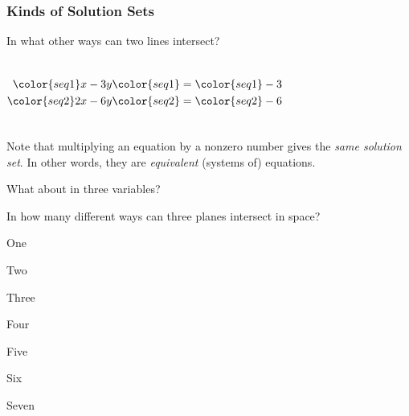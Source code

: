 \begin{frame}
\frametitle{Kinds of Solution Sets}
  
In what other ways can two lines intersect?

\pause\vfill

\begin{columns}[onlytextwidth]
  \[\begin{split}
    \color{seq1}x - 3y &\color{seq1}= \color{seq1}-3 \\
    \color{seq2}2x - 6y &\color{seq2}= \color{seq2}-6
  \end{split}\]
  \pause
  \centering
\end{columns}

\pause
\bigskip
Note that multiplying an equation by a nonzero number gives the
\emph{same solution set}.
\pause In other words, they are \emph{equivalent} (systems
of) equations.

\vfill

\end{frame}



\begin{pollframe}

What about in three variables?
\pause
\bigskip

\begin{bluebox}[Poll]{.65\textwidth}
  In how many different ways can three planes intersect in space?

  \smallskip
  \begin{eAlpherate}
  \item One
  \item Two
  \item Three
  \item Four
  \item Five
  \item Six
  \item Seven
  \end{eAlpherate}
\end{bluebox}


\end{pollframe}


